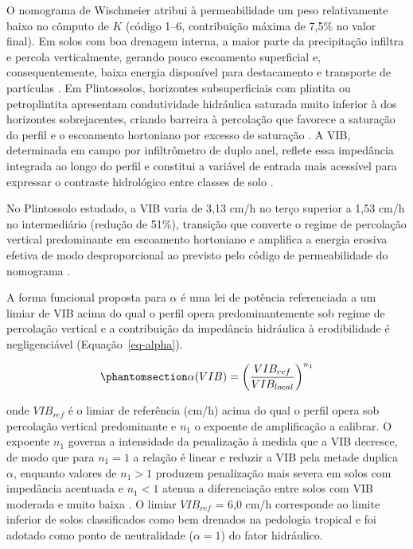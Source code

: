 \documentclass[
  brazilian,
  authoryear,
  preprint]{elsarticle}
\begin{document}
O nomograma de Wischmeier atribui à permeabilidade um peso relativamente
baixo no cômputo de \(K\) (código 1--6, contribuição máxima de 7,5\% no
valor final). Em solos com boa drenagem interna, a maior parte da
precipitação infiltra e percola verticalmente, gerando pouco escoamento
superficial e, consequentemente, baixa energia disponível para
destacamento e transporte de partículas \citep{deroo_1992}. Em
Plintossolos, horizontes subsuperficiais com plintita ou petroplintita
apresentam condutividade hidráulica saturada muito inferior à dos
horizontes sobrejacentes, criando barreira à percolação que favorece a
saturação do perfil e o escoamento hortoniano por excesso de saturação
\citep{padmanabhan_2005}. A VIB, determinada em campo por infiltrômetro
de duplo anel, reflete essa impedância integrada ao longo do perfil e
constitui a variável de entrada mais acessível para expressar o
contraste hidrológico entre classes de solo
\citep{bertoni_lombardi_neto_2017}.

No Plintossolo estudado, a VIB varia de 3,13 cm/h no terço superior a
1,53 cm/h no intermediário (redução de 51\%), transição que converte o
regime de percolação vertical predominante em escoamento hortoniano e
amplifica a energia erosiva efetiva de modo desproporcional ao previsto
pelo código de permeabilidade do nomograma \citep{poesen_2018}.

A forma funcional proposta para \(\alpha\) é uma lei de potência
referenciada a um limiar de VIB acima do qual o perfil opera
predominantemente sob regime de percolação vertical e a contribuição da
impedância hidráulica à erodibilidade é negligenciável
(Equação~\ref{eq-alpha}).

\begin{equation}\phantomsection\label{eq-alpha}{
\alpha(VIB) = \left(\dfrac{VIB_{ref}}{VIB_{local}}\right)^{n_1}
}\end{equation}

onde \(VIB_{ref}\) é o limiar de referência (cm/h) acima do qual o
perfil opera sob percolação vertical predominante e \(n_1\) o expoente
de amplificação a calibrar. O expoente \(n_1\) governa a intensidade da
penalização à medida que a VIB decresce, de modo que para \(n_1 = 1\) a
relação é linear e reduzir a VIB pela metade duplica \(\alpha\),
enquanto valores de \(n_1 > 1\) produzem penalização mais severa em
solos com impedância acentuada e \(n_1 < 1\) atenua a diferenciação
entre solos com VIB moderada e muito baixa \citep{kinnell_2005}. O
limiar \(VIB_{ref}\) = 6,0 cm/h corresponde ao limite inferior de solos
classificados como bem drenados na pedologia tropical
\citep{embrapa_2018} e foi adotado como ponto de neutralidade
(\(\alpha = 1\)) do fator hidráulico.
\end{document}

